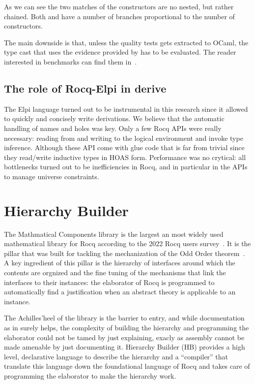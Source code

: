 \documentclass[a4paper, 11pt]{book}
\begin{document}
As we can see the two matches of the constructors are no nested, but rather
chained. Both  and  have a number
of branches proportional to the number of constructors.

The main downside is that, unless the quality tests gets extracted to
OCaml, the type cast that uses the evidence provided by 
has to be evaluated. The reader interested in benchmarks
can find them in~\cite{gregoire:hal-03800154}.

\subsection{The role of Rocq-Elpi in derive}
The Elpi language turned out to be instrumental in this research since
it allowed to quickly and concisely write derivations. We believe that
the automatic handling of names and holes was key. Only a few Rocq APIs were
really necessary: reading from and writing to the logical environment and
invoke type inference. Although these API come with glue code that is far from
trivial since they read/write inductive types in HOAS form.
Performance was no crytical: all bottlenecks turned out to be inefficiencies
in Rocq, and in particular in the APIs to manage universe constraints.


\section{Hierarchy Builder}\label{sec:hb}

The Mathmatical Components library is the largest an most widely used
mathematical library for Rocq according to the 2022 Rocq users
survey~\cite{dealmeidaborges_et_al:LIPIcs.ITP.2023.12}.
It is the pillar that was built for
tackling the mechanization of the Odd Order theorem~\cite{DBLP:conf/itp/GonthierAABCGRMOBPRSTT13}.
A key ingredient of this pillar is the hierarchy of interfaces around which
the contents are orgnized and the fine tuning of the mechanisms that
link the interfaces to their instances: the elaborator of Rocq is
programmed to automatically find a justification when an abstract theory
is applicable to an instance.

The Achilles'heel of the library is the barrier to entry, and while
documentation as in \cite{assia_mahboubi_2022_7118596} surely helps,
the complexity of building the hierarchy and programming the elaborator
could not be tamed by just explaining, exacly as assembly cannot be made
amenable by just documenting it. Hierarchy Builder (HB) provides a high level,
declarative language to describe the hierarchy and a ``compiler'' that
translate this language down the foundational language of Rocq and takes
care of programming the elaborator to make the hierarchy work.
\end{document}
